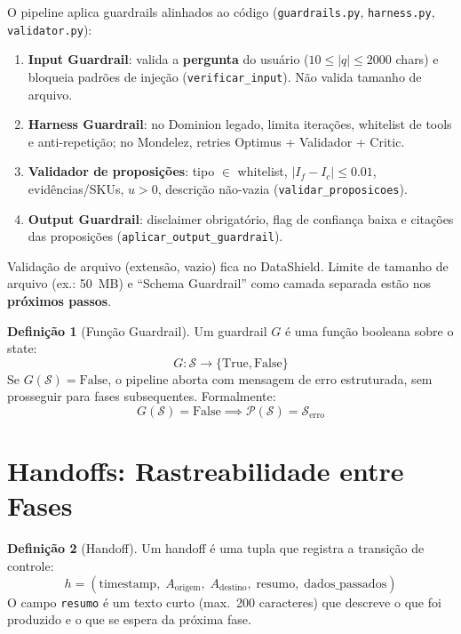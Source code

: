 \documentclass[a4paper, 12pt]{report}
\theoremstyle{definition}
\newtheorem{definicao}{Defini\c{c}\~ao}[chapter]
\theoremstyle{remark}
\newcommand{\state}{\mathcal{S}}
\begin{document}
\begin{caixaguardrail}
  O pipeline aplica guardrails alinhados ao c\'odigo
  (\texttt{guardrails.py}, \texttt{harness.py}, \texttt{validator.py}):
  \begin{enumerate}
    \item \textbf{Input Guardrail}: valida a \textbf{pergunta} do usu\'ario
      ($10 \leq |q| \leq 2000$ chars) e bloqueia padr\~oes de inje\c{c}\~ao
      (\texttt{verificar\_input}). N\~ao valida tamanho de arquivo.
    \item \textbf{Harness Guardrail}: no Dominion legado, limita itera\c{c}\~oes,
      whitelist de tools e anti-repeti\c{c}\~ao; no Mondelez, retries Optimus
      + Validador + Critic.
    \item \textbf{Validador de proposi\c{c}\~oes}: tipo $\in$ whitelist,
      $|I_f - I_c| \leq 0.01$, evid\^encias/SKUs, $u > 0$, descri\c{c}\~ao
      n\~ao-vazia (\texttt{validar\_proposicoes}).
    \item \textbf{Output Guardrail}: disclaimer obrigat\'orio, flag de
      confian\c{c}a baixa e cita\c{c}\~oes das proposi\c{c}\~oes
      (\texttt{aplicar\_output\_guardrail}).
  \end{enumerate}
  Valida\c{c}\~ao de arquivo (extens\~ao, vazio) fica no DataShield.
  Limite de tamanho de arquivo (ex.: 50~MB) e ``Schema Guardrail''
  como camada separada est\~ao nos \textbf{pr\'oximos passos}.
\end{caixaguardrail}

\begin{definicao}[Fun\c{c}\~ao Guardrail]
  Um guardrail $G$ \'e uma fun\c{c}\~ao booleana sobre o state:
  \[
    G : \state \to \{\text{True}, \text{False}\}
  \]
  Se $G(\state) = \text{False}$, o pipeline aborta com mensagem de erro
  estruturada, sem prosseguir para fases subsequentes. Formalmente:
  \[
    G(\state) = \text{False} \implies \mathcal{P}(\state) = \state_{\text{erro}}
  \]
\end{definicao}


\section{Handoffs: Rastreabilidade entre Fases}

\begin{definicao}[Handoff]
  Um handoff \'e uma tupla que registra a transi\c{c}\~ao de controle:
  \[
    h = (\text{timestamp},\; A_{\text{origem}},\; A_{\text{destino}},\;
    \text{resumo},\; \text{dados\_passados})
  \]
  O campo \texttt{resumo} \'e um texto curto (max.\ 200 caracteres)
  que descreve o que foi produzido e o que se espera da pr\'oxima fase.
\end{definicao}
\end{document}
